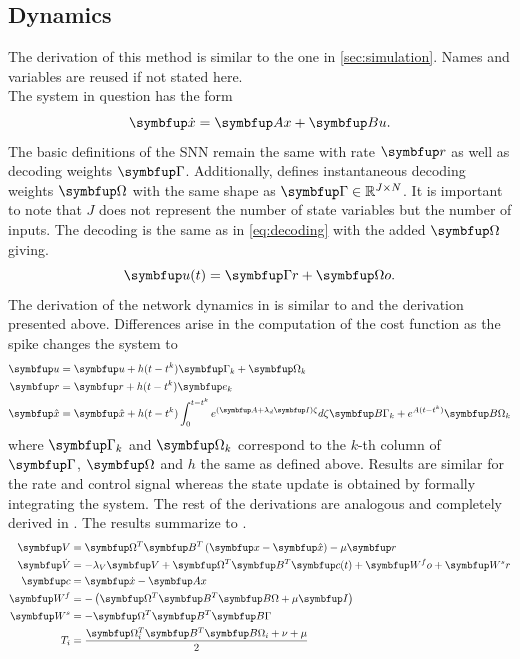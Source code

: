 \subsection{Dynamics}\label{ssec:control_dynamics}
The derivation of this method is similar to the one in \cref{sec:simulation}. Names and variables are reused if not stated here.\\
The system in question has the form
\begin{equation}\label{eq:contsys}
	\bmu{\dot{x}} = \bmu{Ax} + \bmu{Bu}.
\end{equation}
The basic definitions of the \ac{SNN} remain the same with rate $\bmu{r}$ as well as decoding weights $\bmu{\Gamma}$. Additionally, \cite{huang_optimizing_2017} defines instantaneous decoding weights $\bmu{\Omega}$ with the same shape as $\bmu{\Gamma}\in \mathbb{R}^{J\times N}$. It is important to note that $J$ does not represent the number of state variables but the number of inputs. The decoding is the same as in \cref{eq:decoding} with the added $\bmu{\Omega}$ giving.
\begin{equation}
	\bmu{u}(t) = \bmu{\Gamma r} + \bmu{\Omega o}.
\end{equation}
The derivation of the network dynamics in \cite{huang_dynamics_2019} is similar to \cite{boerlin_predictive_2013} and the derivation presented above. Differences arise in the computation of the cost function as the spike changes the system to
\begin{equation}\label{eq:control_spike_change}
	\begin{aligned}
	\bmu{u} &= \bmu{u} + h(t-t^k)\bmu{\Gamma}_k + \bmu{\Omega}_k\\
	\bmu{r} &= \bmu{r} + h(t-t^k)\bmu{e}_k\\
	\bmu{\hat{x}} &= \bmu{\hat{x}} + h(t-t^k)\int_{0}^{t-t^k}e^{(\bmu{A}+\lambda_d\bmu{I})\zeta}d\zeta \bmu{B\Gamma}_k + e^{A(t-t^k)}\bmu{B\Omega}_k
	\end{aligned}
\end{equation}
where $\bmu{\Gamma}_k$ and $\bmu{\Omega}_k$ correspond to the $k$-th column of $\bmu{\Gamma}$, $\bmu{\Omega}$ and $h$ the same as defined above. Results are similar for the rate and control signal whereas the state update is obtained by formally integrating the system. The rest of the derivations are analogous and completely derived in \cite{huang_optimizing_2017}. The results summarize to .
\begin{align}
	\bmu{V} &= \bmu{\Omega}^T\bmu{B}^T\left(\bmu{x} -\bmu{\hat{x}}\right) - \mu \bmu{r}\label{eq:control_dyn_begin}\\
	\bmu{\dot{V}} &= -\lambda_V\bmu{V} + \bmu{\Omega}^T \bmu{B}^T \bmu{c}(t) + \bmu{W^fo} + \bmu{W^sr}\label{eq:control_dyn_2}\\
	\bmu{c} &= \bmu{\dot{x}} - \bmu{Ax}\\\label{eq:feeback_c}
	\bmu{W^f} &= - \left(\bmu{\Omega}^T\bmu{B}^T\bmu{B\Omega} + \mu\bmu{I}\right)\\
	\bmu{W^s} &= -\bmu{\Omega}^T\bmu{B}^T\bmu{B\Gamma}\label{eq:Ws_wrong}\\
	T_i &= \frac{\bmu{\Omega}_i^T\bmu{B}^T\bmu{B\Omega}_i + \nu  + \mu}{2}
	\label{eq:control_dyn_end}
\end{align}

